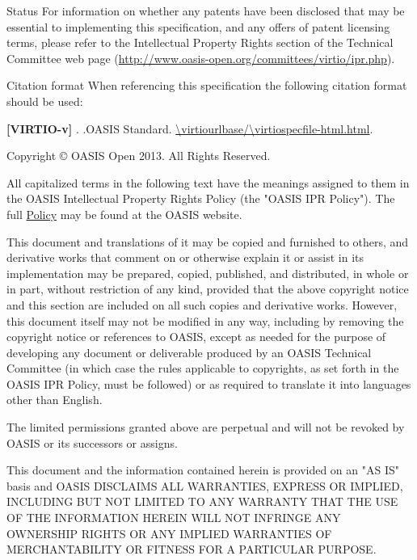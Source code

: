 \begin{titlepage}
\begin{oasistitlesection}{Status}
For information on whether any patents have been disclosed that may be essential to implementing this specification, and any offers of patent licensing terms, please refer to the Intellectual Property Rights section of the Technical Committee web page (\url{http://www.oasis-open.org/committees/virtio/ipr.php}).
\end{oasistitlesection}


\begin{oasistitlesection}{Citation format}
When referencing this specification the following citation format should be used:\newline

\textbf{[VIRTIO-v\virtiorev]}\newline
\textit{\virtioversion}. \virtioworkingdraftdate.\newline OASIS
Standard.
\url{\virtiourlbase/\virtiospecfile-html.html}.
\end{oasistitlesection}

\vfill\newpage


Copyright © OASIS Open 2013. All Rights Reserved.

All capitalized terms in the following text have the meanings assigned
to them in the OASIS Intellectual Property Rights Policy (the "OASIS
IPR Policy"). The full \href{https://www.oasis-open.org/policies-guidelines/ipr}{Policy} may be found at the OASIS website.

This document and translations of it may be copied and furnished to
others, and derivative works that comment on or otherwise explain it
or assist in its implementation may be prepared, copied, published,
and distributed, in whole or in part, without restriction of any kind,
provided that the above copyright notice and this section are included
on all such copies and derivative works. However, this document itself
may not be modified in any way, including by removing the copyright
notice or references to OASIS, except as needed for the purpose of
developing any document or deliverable produced by an OASIS Technical
Committee (in which case the rules applicable to copyrights, as set
forth in the OASIS IPR Policy, must be followed) or as required to
translate it into languages other than English.

The limited permissions granted above are perpetual and will not be
revoked by OASIS or its successors or assigns.

This document and the information contained herein is provided on an
"AS IS" basis and OASIS DISCLAIMS ALL WARRANTIES, EXPRESS OR IMPLIED,
INCLUDING BUT NOT LIMITED TO ANY WARRANTY THAT THE USE OF THE
INFORMATION HEREIN WILL NOT INFRINGE ANY OWNERSHIP RIGHTS OR ANY
IMPLIED WARRANTIES OF MERCHANTABILITY OR FITNESS FOR A PARTICULAR
PURPOSE.


\end{titlepage}
